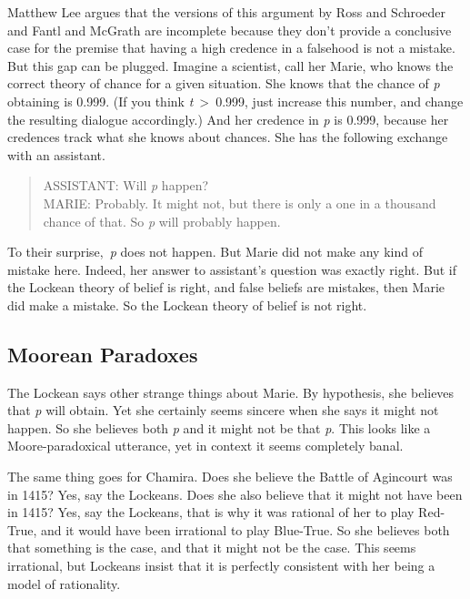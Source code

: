 \documentclass[
  11pt,
]{book}
\begin{document}
Matthew Lee \citeyearpar{Lee2017a} argues that the versions of this argument by Ross and Schroeder \citeyearpar{RossSchroeder2014} and Fantl and McGrath \citeyearpar{FantlMcGrath2009} are incomplete because they don't provide a conclusive case for the premise that having a high credence in a falsehood is not a mistake. But this gap can be plugged. Imagine a scientist, call her Marie, who knows the correct theory of chance for a given situation. She knows that the chance of \emph{p} obtaining is 0.999. (If you think \emph{t}~\textgreater~0.999, just increase this number, and change the resulting dialogue accordingly.) And her credence in \emph{p} is 0.999, because her credences track what she knows about chances. She has the following exchange with an assistant.

\begin{quote}
ASSISTANT: Will \emph{p} happen?\\
MARIE: Probably. It might not, but there is only a one in a thousand chance of that. So \emph{p} will probably happen.
\end{quote}

To their surprise,~\emph{p} does not happen. But Marie did not make any kind of mistake here. Indeed, her answer to assistant's question was exactly right. But if the Lockean theory of belief is right, and false beliefs are mistakes, then Marie did make a mistake. So the Lockean theory of belief is not right.

\hypertarget{lockemoore}{%
\subsection{Moorean Paradoxes}\label{lockemoore}}

The Lockean says other strange things about Marie. By hypothesis, she believes that \emph{p} will obtain. Yet she certainly seems sincere when she says it might not happen. So she believes both \emph{p} and it might not be that \emph{p}. This looks like a Moore-paradoxical utterance, yet in context it seems completely banal.

The same thing goes for Chamira. Does she believe the Battle of Agincourt was in 1415? Yes, say the Lockeans. Does she also believe that it might not have been in 1415? Yes, say the Lockeans, that is why it was rational of her to play Red-True, and it would have been irrational to play Blue-True. So she believes both that something is the case, and that it might not be the case. This seems irrational, but Lockeans insist that it is perfectly consistent with her being a model of rationality.
\end{document}

